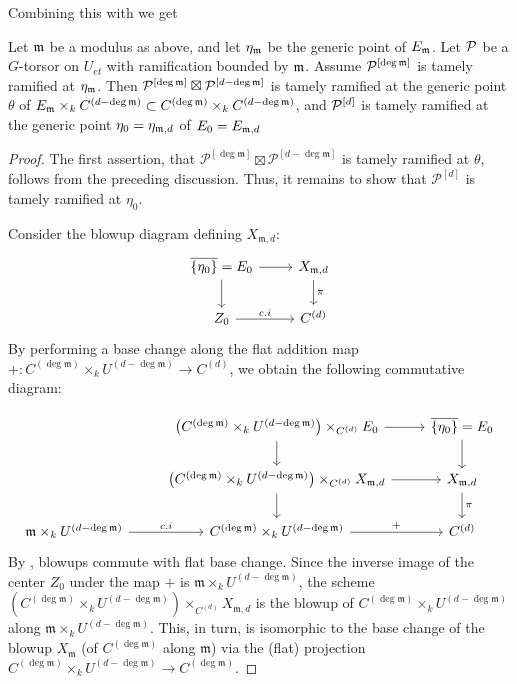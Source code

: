Combining this with  we get

\begin{cor}\label{cor:tame-ramification-symmetric-product}
     Let $\mathfrak{m}$ be a modulus as above, and let $\eta_{\mathfrak{m}}$ be the generic point of $E_{\mathfrak{m}}$.
     Let $\mathcal{P}$ be a $G$-torsor on $U_{et}$ with ramification bounded by $\mathfrak{m}$.
     Assume $\mathcal{P}^{[\deg \mathfrak{m}]}$ is tamely ramified at $\eta_{\mathfrak{m}}$.
     Then ${\mathcal{P}^{[\deg \mathfrak{m}]}} \boxtimes \mathcal{P}^{[d - \deg \mathfrak{m}]}$ is tamely ramified at the generic point $\theta$ of
     $E_{\mathfrak{m}} \times_k C^{(d-\deg \mathfrak{m})} \subset C^{(\deg \mathfrak{m})} \times_k C^{(d - \deg \mathfrak{m})}$,
     and $\mathcal{P}^{[d]}$ is tamely ramified at the generic point $\eta_0=\eta_{\mathfrak{m},d}$ of $E_0=E_{\mathfrak{m},d}$
\end{cor}
\begin{proof}
The first assertion, that $\mathcal{P}^{[\deg \mathfrak{m}]} \boxtimes \mathcal{P}^{[d - \deg \mathfrak{m}]}$ is tamely ramified at $\theta$, follows from the preceding discussion. Thus, it remains to show that $\mathcal{P}^{[d]}$ is tamely ramified at $\eta_0$.

Consider the blowup diagram defining $X_{\mathfrak{m}, d}$:
\[
\begin{tikzcd}
\overline{\{\eta_0 \}} =  E_0 \arrow[r] \arrow[d] & X_{\mdls, d} \arrow[d, "\pi"] \\
Z_0 \arrow[r, "c.i"]           & C^{(d)}
\end{tikzcd}
\]
By performing a base change along the flat addition map $+: C^{(\deg \mathfrak{m})} \times_k U^{(d-\deg \mathfrak{m})} \to C^{(d)}$, we obtain the following commutative diagram:

\[
\begin{tikzcd}
&  \left(C^{(\deg \mdls)} \times_k U^{(d-\deg \mdls)} \right) \times_{C^{(d)}} E_0 \arrow[r] \arrow[d] & \overline{\{\eta_0 \}} =  E_0 \arrow[d] \\
& \left(C^{(\deg \mdls)} \times_k U^{(d-\deg \mdls)} \right) \times_{C^{(d)}} X_{\mdls, d} \arrow[d] \arrow[r] & X_{\mdls, d} \arrow[d, "\pi"] \\
\mdls \times_k U^{(d-\deg \mdls)} \arrow[r, "c.i"] & C^{(\deg \mdls)} \times_k U^{(d-\deg \mdls)} \arrow[r, "+"]  & C^{(d)}
\end{tikzcd}
\]
By , blowups commute with flat base
change. Since the inverse image of the center $Z_0$ under the map $+$ is
$\mathfrak{m} \times_k U^{(d-\deg \mathfrak{m})}$, the scheme
$\left(C^{(\deg \mathfrak{m})} \times_k U^{(d-\deg \mathfrak{m})} \right)
\times_{C^{(d)}} X_{\mathfrak{m}, d}$ is the blowup of
$C^{(\deg \mathfrak{m})} \times_k U^{(d-\deg \mathfrak{m})}$ along
$\mathfrak{m} \times_k U^{(d-\deg \mathfrak{m})}$.
This, in turn, is isomorphic to the base change of the blowup $X_{\mathfrak{m}}$ (of $C^{(\deg \mathfrak{m})}$ along $\mathfrak{m}$) via the (flat) projection $C^{(\deg \mathfrak{m})} \times_k U^{(d - \deg \mathfrak{m})} \to C^{(\deg \mathfrak{m})}$.


\end{proof}
